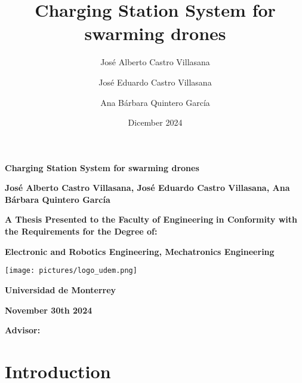 \documentclass[11pt]{report} %
\title{Charging Station System for swarming drones} %
\author{José Alberto Castro Villasana \and José Eduardo Castro Villasana \and Ana Bárbara Quintero García} %
\date{Dicember 2024} %
\begin{document}
\begin{titlepage}
    \centering
    \vspace*{1cm}
    
    {\Huge\textbf{Charging Station System for swarming drones}} %
    
    \vspace{2.5cm} %
    {\Large\textbf{José Alberto Castro Villasana, José Eduardo Castro Villasana, Ana Bárbara Quintero García}} %
    
    \vfill
    
    {\large\textbf{A Thesis Presented to the Faculty of Engineering}} %
    {\large\textbf{in Conformity with the Requirements for the Degree of:}} %

    \vspace{0.2cm}
    {\large\textbf{Electronic and Robotics Engineering, Mechatronics Engineering}} %

    \vspace{2cm}
    
    \texttt{[image: pictures/logo\_udem.png]} %
    
    \vspace{2cm}
    
    {\large\textbf{Universidad de Monterrey}}

    \vspace{0.2cm}
    {\large{}} 

    \vspace{0.2cm}
    {\large{}} %
    
    \vspace{1.5cm}
    {\large\textbf{November 30th 2024}} %
    
    \vfill
    {\large\textbf{Advisor:} } %
    
\end{titlepage}

\tableofcontents
\newpage

\onehalfspacing%

\chapter{Introduction} %
\end{document}
